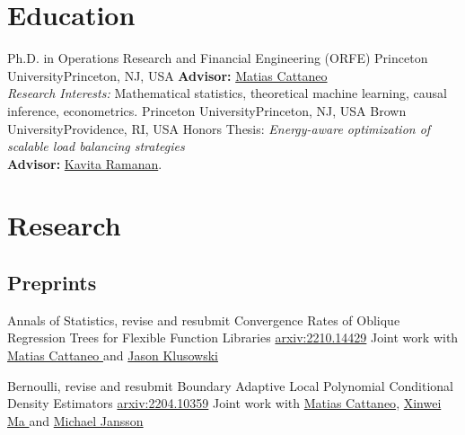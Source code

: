 \documentclass[10pt,a4paper,roman]{moderncv}        %
\begin{document}
\makecvtitle

\vspace{-0.7cm}
\section{Education}
{Ph.D. in Operations Research and Financial Engineering (ORFE)}
{Princeton University}{Princeton, NJ, USA}{}
{\textbf{Advisor: }\color{blue}\href{https://cattaneo.princeton.edu}{Matias Cattaneo}\color{black}\\
\textit{Research Interests:} Mathematical statistics, theoretical machine learning, causal inference, econometrics.}
{Princeton University}{Princeton, NJ, USA}{}{}
{Brown University}{Providence, RI, USA}{}{ Honors Thesis: \textit{Energy-aware optimization of scalable load balancing
    strategies}
  \\
  \textbf{Advisor: }
  \color{blue}\href{https://www.brown.edu/academics/applied-mathematics/faculty/kavita-ramanan/home}
  {Kavita Ramanan}\color{black}.}  %
{}

\vspace{-0.3cm}
\section{Research}
\subsection{Preprints}
\cventry{}
{Annals of Statistics, revise and resubmit}
{Convergence Rates of Oblique Regression Trees for Flexible Function Libraries}
{\color{blue} \href{https://arxiv.org/abs/2210.14429}{arxiv:2210.14429} \color{black}}
{}
{Joint work with
  \color{blue}\href{https://cattaneo.princeton.edu}{Matias Cattaneo }\color{black} and
  \color{blue}\href{https://klusowski.princeton.edu}{Jason Klusowski}}

\cventry{}
{Bernoulli, revise and resubmit}
{Boundary Adaptive Local Polynomial Conditional Density Estimators}
{\color{blue}\href{https://arxiv.org/abs/2204.10359}{arxiv:2204.10359}\color{black}}{}
{Joint work with \color{blue}\href{https://cattaneo.princeton.edu}{Matias Cattaneo}\color{black},
  \color{blue}\href{https://sites.google.com/view/xinweima/home?authuser=0}{Xinwei
    Ma }\color{black}
  and
  \color{blue}\href{https://sites.google.com/berkeley.edu/michael-jansson/}{Michael
    Jansson}\color{black}
}
\end{document}
